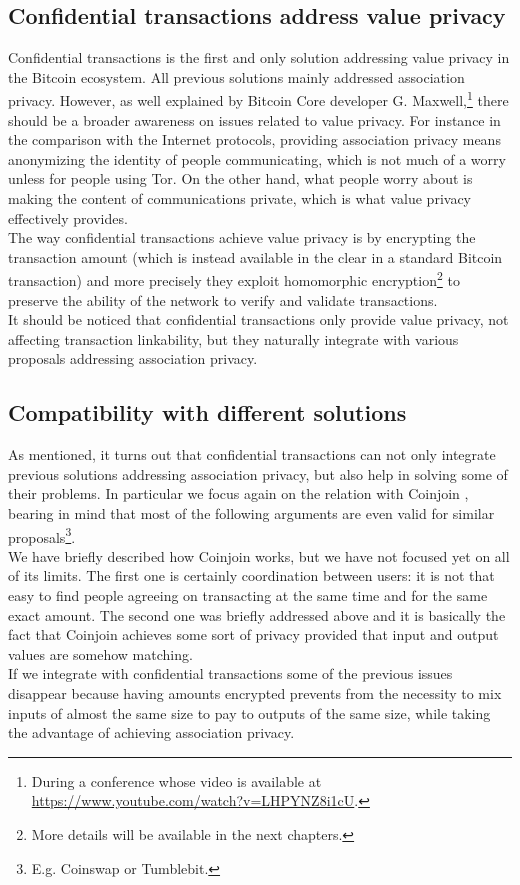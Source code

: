 \subsection{Confidential transactions address value privacy}
Confidential transactions is the first and only solution addressing value privacy in the Bitcoin ecosystem. All previous solutions mainly addressed association privacy. However, as well explained by Bitcoin Core developer G. Maxwell,\footnote{During a conference whose video is available at \url{https://www.youtube.com/watch?v=LHPYNZ8i1cU}.} there should be a broader awareness on issues related to value privacy. For instance in the comparison with the Internet protocols, providing association privacy means anonymizing the identity of people communicating, which is not much of a worry unless for people using Tor. On the other hand, what people worry about is making the content of communications private, which is what value privacy effectively provides.\\
The way confidential transactions achieve value privacy is by encrypting the transaction amount (which is instead available in the clear in a standard Bitcoin transaction) and more precisely they exploit homomorphic encryption\footnote{More details will be available in the next chapters.} to preserve the ability of the network to verify and validate transactions.\\
It should be noticed that confidential transactions only provide value privacy, not affecting transaction linkability, but they naturally integrate with various proposals addressing association privacy.

\subsection{Compatibility with different solutions}
As mentioned, it turns out that confidential transactions can not only integrate previous solutions addressing association privacy, but also help in solving some of their problems. In particular 
we focus again on the relation with Coinjoin \cite{Max13}, bearing in mind that most of the following arguments are even valid for similar proposals\footnote{E.g. Coinswap or Tumblebit.}.\\
We have briefly described how Coinjoin works, but we have not focused yet on all of its limits. The first one is certainly coordination between users: it is not that easy to find people agreeing on transacting at the same time and for the same exact amount. The second one was briefly addressed above and it is basically the fact that Coinjoin achieves some sort of privacy provided that input and output values are somehow matching.\\
If we integrate with confidential transactions some of the previous issues disappear because having amounts encrypted prevents from the necessity to mix inputs of almost the same size to pay to outputs of the same size, while taking the advantage of achieving association privacy.

